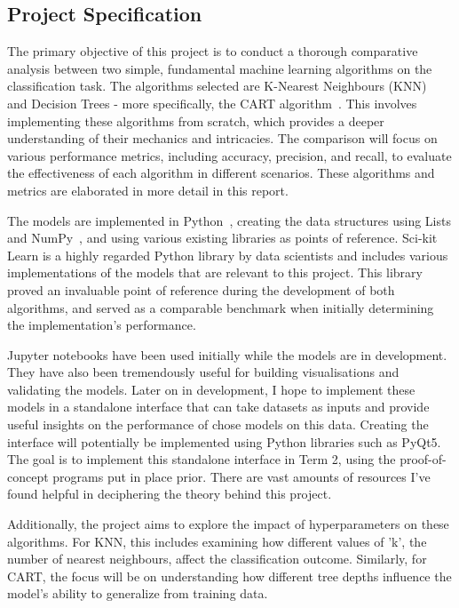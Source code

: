 \documentclass[letterpaper,10pt]{article}
\begin{document}
\newpage
\subsection{Project Specification}
The primary objective of this project is to conduct a thorough comparative analysis between two simple, fundamental machine learning algorithms on the classification task. The algorithms selected are K-Nearest Neighbours (KNN)~\cite{NNEFixHodges,NNCoverHart} and Decision Trees - more specifically, the CART algorithm~\cite{CARTBreiman}. This involves implementing these algorithms from scratch, which provides a deeper understanding of their mechanics and intricacies. The comparison will focus on various performance metrics, including accuracy, precision, and recall, to evaluate the effectiveness of each algorithm in different scenarios. These algorithms and metrics are elaborated in more detail in this report. \par
The models are implemented in Python~\cite{python3}, creating the data structures using Lists and NumPy~\cite{numpy}, and using various existing libraries as points of reference. Sci-kit Learn is a highly regarded Python library by data scientists and includes various implementations of the models that are relevant to this project. This library proved an invaluable point of reference during the development of both algorithms, and served as a comparable benchmark when initially determining the implementation's performance. \par
Jupyter notebooks have been used initially while the models are in development.
They have also been tremendously useful for building visualisations and
validating the models. Later on in development, I hope to implement these models
in a standalone interface that can take datasets as inputs and provide useful
insights on the performance of chose models on this data. Creating the interface
will potentially be implemented using Python libraries such as PyQt5. The goal is to implement this standalone interface in Term 2, using the proof-of-concept programs put in place prior. There are vast amounts of resources I’ve found helpful in deciphering the theory behind this project. \par
Additionally, the project aims to explore the impact of hyperparameters on these algorithms. For KNN, this includes examining how different values of 'k', the number of nearest neighbours, affect the classification outcome. Similarly, for CART, the focus will be on understanding how different tree depths influence the model's ability to generalize from training data.
\end{document}
